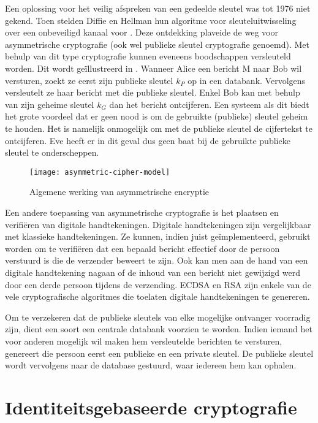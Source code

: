 Een oplossing voor het veilig afspreken van een gedeelde sleutel was tot 1976 niet gekend. Toen stelden Diffie en Hellman hun algoritme voor sleuteluitwisseling over een onbeveiligd kanaal voor \cite{diffie-hellman}. Deze ontdekking plaveide de weg voor asymmetrische cryptografie (ook wel publieke sleutel cryptografie genoemd). Met behulp van dit type cryptografie kunnen eveneens boodschappen versleuteld worden. Dit wordt ge\"illustreerd in . Wanneer Alice een bericht M naar Bob wil versturen, zoekt ze eerst zijn publieke sleutel $k_P$ op in een databank. Vervolgens versleutelt ze haar bericht met die publieke sleutel. Enkel Bob kan met behulp van zijn geheime sleutel $k_G$ dan het bericht ontcijferen. Een systeem als dit biedt het grote voordeel dat er geen nood is om de gebruikte (publieke) sleutel geheim te houden. Het is namelijk onmogelijk om met de publieke sleutel de cijfertekst te ontcijferen. Eve heeft er in dit geval dus geen baat bij de gebruikte publieke sleutel te onderscheppen. 

\begin{figure}[h]
	\centering
		 \texttt{[image: asymmetric-cipher-model]}
		 \caption{Algemene werking van asymmetrische encryptie\label{fig-encryptie-applicaties-asym-cipher}}
\end{figure}

Een andere toepassing van asymmetrische cryptografie is het plaatsen en verifi\"eren van digitale handtekeningen. Digitale handtekeningen zijn vergelijkbaar met klassieke handtekeningen. Ze kunnen, indien juist ge\-\"im\-ple\-men\-teerd, gebruikt worden om te verifi\"eren dat een bepaald bericht effectief door de persoon verstuurd is die de verzender beweert te zijn. Ook kan men aan de hand van een digitale handtekening nagaan of de inhoud van een bericht niet gewijzigd werd door een derde persoon tijdens de verzending. ECDSA \cite{ecdsa} en RSA \cite{rsa} zijn enkele van de vele cryptografische algoritmes die toelaten digitale handtekeningen te genereren.

Om te verzekeren dat de publieke sleutels van elke mogelijke ontvanger voorradig zijn, dient een soort een centrale databank voorzien te worden. Indien iemand het voor anderen mogelijk wil maken hem versleutelde berichten te versturen, genereert die persoon eerst een publieke en een private sleutel. De publieke sleutel wordt vervolgens naar de database gestuurd, waar iedereen hem kan ophalen.

\section{Identiteitsgebaseerde cryptografie}

